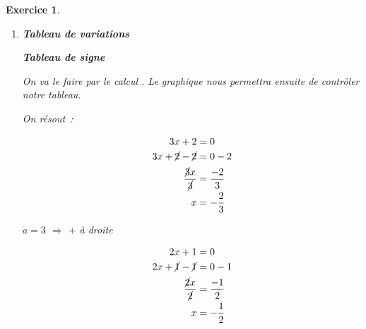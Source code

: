 \documentclass[10pt]{article}
\newtheorem{exo}{Exercice}
\begin{document}
\begin{exo}
\begin{enumerate}
\begin{itemize}
Il en est de même pour de \og grandes valeurs négatives \fg~:

\[f(\np{-1000})=\frac{3\times (-\np{1000})+2}{2\times (-\np{1000})+1}=\frac{\np{2998}}{ \np{1999}}\approx\np{1,49975}.\]
\item[\textbullet] La courbe s'appelle une hyperbole. Pour effectuer le tracé, une personne expérimentée se contenterait de placer les points de coordonnées $(-1;1)$ et $(0;2),$ puis viendrait \og s'appuyer \fg~{} sur les droites en pointillés (qu'il aurait préalablement tracées).
\item[\textbullet] Le point d'intersection des droites $d_1$ et $d_2$ est centre de symétrie pour la courbe.
\end{itemize}
\item \textbf{Tableau de variations}

\medskip

\begin{center}
\end{center}

\medskip

\newpage

\textbf{Tableau de signe}

\medskip

On va le faire \og par le calcul \fg. Le graphique nous permettra ensuite de contrôler notre tableau.

\setlength{\columnseprule}{1pt}

\begin{multicols}{2}

On résout~:

\begin{align*}
3x+2&=0\\
3x+\cancel{2}-\cancel{2}&=0-2\\
\frac{\cancel{3}x}{\cancel{3}}&=\frac{-2}{3}\\
x&=-\frac{2}{3}
\end{align*}

$a=3$ $\Rightarrow$ $+$ à droite

\columnbreak

\begin{align*}
2x+1&=0\\
2x+\cancel{1}-\cancel{1}&=0-1\\
\frac{\cancel{2}x}{\cancel{2}}&=\frac{-1}{2}\\
x&=-\frac{1}{2}
 \end{align*}
 

\end{multicols}
\end{enumerate}
\end{exo}
\end{document}
